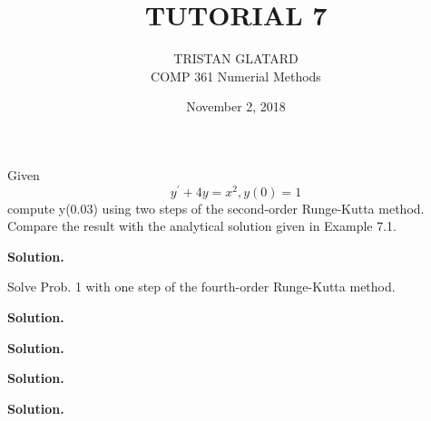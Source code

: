  

 

\title{TUTORIAL 7}%
\author{TRISTAN GLATARD\\ %
COMP 361 Numerial Methods} %
\date{November 2, 2018} 
\maketitle

\begin{exercise}{1} %
Given 
$$y^\prime + 4y = x^2, y(0) = 1$$
compute y(0.03) using two steps of the second-order Runge-Kutta method. Compare the result with the analytical solution given in Example 7.1.

\textbf{Solution.} 

\end{exercise}

\begin{exercise}{2} %
Solve Prob. 1 with one step of the fourth-order Runge-Kutta method.

\textbf{Solution.}

\end{exercise}


\begin{exercise}{3} %

\textbf{Solution.}

\end{exercise}


\begin{exercise}{4} %

\textbf{Solution.}

\end{exercise}


\begin{exercise}{5} %

\textbf{Solution.}

\end{exercise}


